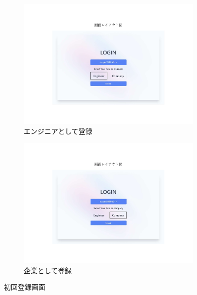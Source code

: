 \documentclass[10pt]{ltjsarticle}
\begin{document}
\begin{figure}[H]
    \centering
    \begin{subfigure}{0.49\textwidth}
        \centering
        \includegraphics[trim=5.2cm 3.4cm 5.2cm 4.6cm, clip, width=\linewidth]{./img/login_pages_engineer.pdf}
        \caption{エンジニアとして登録}
        \label{fig:login_engineer}
    \end{subfigure}
    \hfill
    \begin{subfigure}{0.49\textwidth}
        \centering
        \includegraphics[trim=5.2cm 3.4cm 5.2cm 4.6cm, clip, width=\linewidth]{./img/login_pages_company.pdf}
        \caption{企業として登録}
        \label{fig:login_company}
    \end{subfigure}
    \caption{初回登録画面}
    \label{fig:register}
\end{figure}
\vspace{-.5cm}
\end{document}
